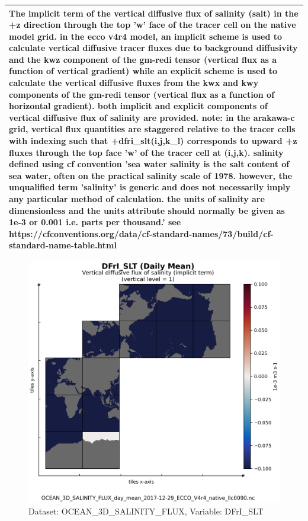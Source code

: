 \begin{longtable}{|m{}|m{}|m{}|m{}|}
\multicolumn{4}{|p{1\textwidth}|}{\footnotesize{{The implicit term of the vertical diffusive flux of salinity (salt) in the +z direction through the top 'w' face of the tracer cell on the native model grid. in the ecco v4r4 model, an implicit scheme is used to calculate vertical diffusive tracer fluxes due to background diffusivity and the kwz component of the gm-redi tensor (vertical flux as a function of vertical gradient) while an explicit scheme is used to calculate the vertical diffusive fluxes from the kwx and kwy components of the gm-redi tensor (vertical flux as a function of horizontal gradient). both implicit and explicit components of vertical diffusive flux of salinity are provided. note: in the arakawa-c grid, vertical flux quantities are staggered relative to the tracer cells with indexing such that +dfri\_slt(i,j,k\_l) corresponds to upward +z fluxes through the top face 'w' of the tracer cell at (i,j,k). salinity defined using cf convention 'sea water salinity is the salt content of sea water, often on the practical salinity scale of 1978. however, the unqualified term 'salinity' is generic and does not necessarily imply any particular method of calculation. the units of salinity are dimensionless and the units attribute should normally be given as 1e-3 or 0.001 i.e. parts per thousand.' see https://cfconventions.org/data/cf-standard-names/73/build/cf-standard-name-table.html}}} \\ \hline
\end{longtable}

\begin{figure}[H]
\centering
\includegraphics[scale=0.55]{../images/plots/native_plots/Ocean_Three-Dimensional_Salinity_Fluxes/DFrI_SLT.png}
\caption{Dataset: OCEAN\_3D\_SALINITY\_FLUX, Variable: DFrI\_SLT}
\label{tab:table-OCEAN_3D_SALINITY_FLUX_DFrI_SLT-Plot}
\end{figure}
\newpage
\pagebreak
